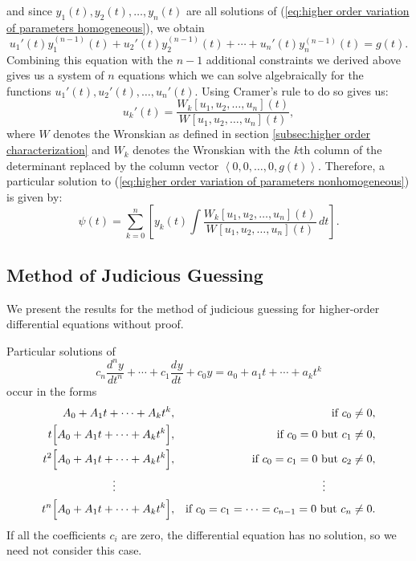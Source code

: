 \documentclass{myart}
\newcommand{\eq}[1]{(\ref{eq:#1})}
\newcommand{\deriv}[3][]{\frac{d^{#1}#2}{d#3^{#1}}}
\newcommand{\vect}[1]{\left\langle#1\right\rangle}
\newcommand{\W}[2][]{W_{#1}\left[#2\right]}
\begin{document}
and since $y_1(t), y_2(t), \ldots, y_n(t)$ are all solutions of \eq{higher order variation of parameters homogeneous}, we obtain
\begin{equation*}
u_1'(t)y_1^{(n-1)}(t) + u_2'(t)y_2^{(n-1)}(t) + \cdots + u_n'(t)y_n^{(n-1)}(t) = g(t).
\end{equation*}
Combining this equation with the $n-1$ additional constraints we derived above gives us a system of $n$ equations which we can solve algebraically for the functions $u_1'(t), u_2'(t), \ldots, u_n'(t)$. Using Cramer's rule to do so gives us:
\begin{equation*}
u_k'(t) = \frac{\W[k]{u_1, u_2, \ldots, u_n}(t)}{\W{u_1, u_2, \ldots, u_n}(t)},
\end{equation*}
where $W$ denotes the Wronskian as defined in section \ref{subsec:higher order characterization} and $W_k$ denotes the Wronskian with the $k$th column of the determinant replaced by the column vector $\vect{0, 0, \ldots, 0, g(t)}$. Therefore, a particular solution to \eq{higher order variation of parameters nonhomogeneous} is given by:
\begin{equation*}
\psi(t) = \sum_{k=0}^n \left[y_k(t) \int \frac{\W[k]{u_1, u_2, \ldots, u_n}(t)}{\W{u_1, u_2, \ldots, u_n}(t)} \,dt\right].
\end{equation*}

\subsection{Method of Judicious Guessing} \label{subsec:higher order judicious guessing}

We present the results for the method of judicious guessing for higher-order differential equations without proof.

Particular solutions of
\begin{equation*}
c_n \deriv[n]{y}{t} + \cdots + c_1 \deriv{y}{t} + c_0 y = a_0 + a_1 t + \cdots + a_k t^k
\end{equation*}
occur in the forms
\begin{align*}
A_0 + A_1 t + \cdots + A_k t^k, && \text{if $c_0 \neq 0$}, \\
t\Big[A_0 + A_1 t + \cdots + A_k t^k\Big], && \text{if $c_0 = 0$ but $c_1 \neq 0$}, \\
t^2\Big[A_0 + A_1 t + \cdots + A_k t^k\Big], && \text{if $c_0 = c_1 = 0$ but $c_2 \neq 0$}, \\
\vdots \hspace{52.25pt} && \vdots \hspace{44.5pt} \\
t^n\Big[A_0 + A_1 t + \cdots + A_k t^k\Big], && \text{if $c_0 = c_1 = \cdots = c_{n-1} = 0$ but $c_n \neq 0$}.
\end{align*}
If all the coefficients $c_i$ are zero, the differential equation has no solution, so we need not consider this case.
\end{document}
